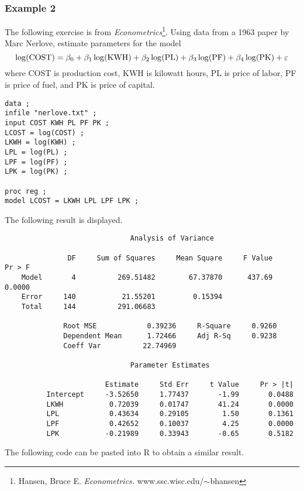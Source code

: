 \documentclass[12pt]{article}
\begin{document}
\subsubsection*{Example 2}

The following exercise is from {\it Econometrics}\footnote{
Hansen, Bruce E. {\it Econometrics.}
www.ssc.wisc.edu/$\sim$bhansen}.
Using data from a 1963 paper by Marc Nerlove,
estimate parameters for the model
\[
\log({\rm COST})=\beta_0+\beta_1\log({\rm KWH})
+\beta_2\log({\rm PL})+\beta_3\log({\rm PF})+\beta_4\log({\rm PK})
+\varepsilon
\]
where COST is production cost,
KWH is kilowatt hours,
PL is price of labor,
PF is price of fuel,
and PK is price of capital.

{\footnotesize\begin{verbatim}
data ;
infile "nerlove.txt" ;
input COST KWH PL PF PK ;
LCOST = log(COST) ;
LKWH = log(KWH) ;
LPL = log(PL) ;
LPF = log(PF) ;
LPK = log(PK) ;

proc reg ;
model LCOST = LKWH LPL LPF LPK ;
\end{verbatim}}

The following result is displayed.

{\footnotesize\begin{verbatim}
                              Analysis of Variance

               DF     Sum of Squares     Mean Square     F Value     Pr > F
    Model       4          269.51482        67.37870      437.69     0.0000
    Error     140           21.55201         0.15394                       
    Total     144          291.06683                                       

              Root MSE            0.39236     R-Square     0.9260
              Dependent Mean      1.72466     Adj R-Sq     0.9238
              Coeff Var          22.74969                        

                              Parameter Estimates

                        Estimate     Std Err     t Value     Pr > |t|
          Intercept     -3.52650     1.77437       -1.99       0.0488
          LKWH           0.72039     0.01747       41.24       0.0000
          LPL            0.43634     0.29105        1.50       0.1361
          LPF            0.42652     0.10037        4.25       0.0000
          LPK           -0.21989     0.33943       -0.65       0.5182
\end{verbatim}}

The following code can be pasted into R to obtain a similar result.
\end{document}
